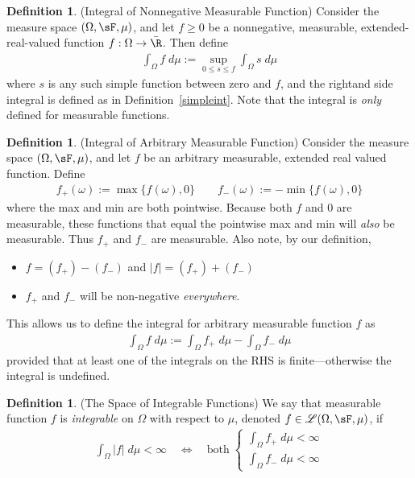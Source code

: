 \documentclass[12pt]{article}
\theoremstyle{plain}
\theoremstyle{definition}
\newtheorem{defn}[thm]{Definition}
\theoremstyle{remark}
\newcommand{\ra}{\rightarrow}
\begin{document}
\begin{defn}(Integral of Nonnegative Measurable Function)
Consider the measure space $(\Omega,\sF,\mu)$, and let $f\geq0$ be a
nonnegative, measurable, extended-real-valued function
$f:\Omega\ra\bar{\R}$. Then define
\begin{align*}
    \int_\Omega f \; d\mu := \sup_{0\leq s\leq f} \int_\Omega s \; d\mu
\end{align*}
where $s$ is any such simple function between zero and $f$, and the
rightand side integral is defined as in Definition~\ref{simpleint}. Note
that the integral is \emph{only} defined for measurable functions.
\end{defn}

\begin{defn}(Integral of Arbitrary Measurable Function)
Consider the measure space $(\Omega,\sF,\mu)$, and let $f$ be an
arbitrary measurable, extended real valued function. Define
\begin{align*}
    f_+(\omega) := \max\{f(\omega), 0\}
    \qquad
    f_-(\omega) := -\min\{f(\omega), 0\}
\end{align*}
where the max and min are both pointwise.
Because both $f$ and $0$ are measurable, these functions that equal the
pointwise max and min will \emph{also} be measurable. Thus $f_+$ and
$f_-$ are measurable. Also note, by our definition,
\begin{itemize}
  \item $f = (f_+) - (f_-)$ and $|f| = (f_+) + (f_-)$
  \item $f_+$ and $f_-$ will be non-negative \emph{everywhere}.
\end{itemize}
This allows us to define the integral for arbitrary measurable function
$f$ as
\begin{align*}
  \int_\Omega f\; d\mu := \int_\Omega f_+ \; d\mu - \int_\Omega f_- \; d\mu
\end{align*}
provided that at least one of the integrals on the RHS is
finite---otherwise the integral is undefined.
\end{defn}

\begin{defn}(The Space of Integrable Functions)
We say that measurable function $f$ is \emph{integrable}
on $\Omega$ with respect to $\mu$, denoted
$f\in\mathscr{L}(\Omega,\sF,\mu)$, if
\begin{align*}
  \int_\Omega |f| \; d\mu < \infty
  \quad\iff\quad
  \text{both} \;
  \begin{cases}
    \int_\Omega f_+ \; d\mu < \infty \\
    \int_\Omega f_- \; d\mu < \infty
  \end{cases}
\end{align*}
\end{defn}
\end{document}
